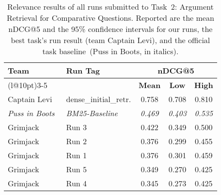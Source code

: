 \begin{table}[t]
\centering
\small
\renewcommand{\tabcolsep}{10pt}
\caption{Relevance results of all runs submitted to Task~2: Argument Retrieval for Comparative Questions. Reported are the mean nDCG@5 and the 95\% confidence intervals for our runs, the best task's run result (team Captain Levi), and the official task baseline~(Puss in Boots, in italics).}
\label{table-results-relevance}
\begin{tabular}{@{}llccc@{}}
\toprule
\textbf{Team} & \textbf{Run Tag} & \multicolumn{3}{c}{\textbf{nDCG@5}} \\
\cmidrule(l@{\tabcolsep}){3-5}
& & \textbf{Mean} & \textbf{Low} & \textbf{High} \\
\midrule
Captain Levi~\cite{RanaGJCEHP2022} & dense\_initial\_retr. & 0.758 & 0.708 & 0.810 \\
\textit{Puss in Boots}~\cite{BondarenkoFKSGBPBSWPH2022} & \textit{BM25-Baseline} & \textit{0.469} & \textit{0.403} & \textit{0.535} \\
Grimjack & Run 3 & 0.422 & 0.349 & 0.500 \\
Grimjack & Run 2 & 0.376 & 0.299 & 0.455 \\
Grimjack & Run 1 & 0.376 & 0.301 & 0.459 \\
Grimjack & Run 5 & 0.349 & 0.270 & 0.425 \\
Grimjack & Run 4 & 0.345 & 0.273 & 0.425 \\
\bottomrule
\end{tabular}
\end{table}
